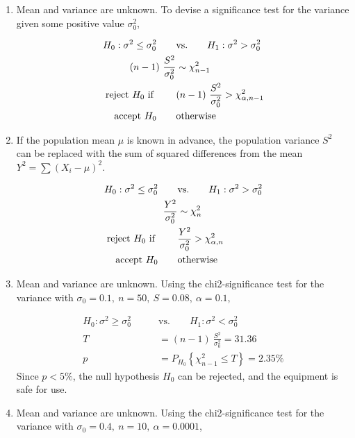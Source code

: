 \begin{enumerate}
	\item Mean and variance are unknown. To devise a significance test for the variance given some positive value $ \sigma^2_0 $,
	
	\begin{align}
		H_0 : \sigma^2 \leq \sigma_0^2 \qquad &\text{vs.} \qquad H_1 : \sigma^2 > \sigma_0^2 \nonumber \\
		(n-1)\ \frac{S^2}{\sigma_0^2} &\sim \chi^2_{n-1} \nonumber \\
		\text{reject $ H_0 $ if } \qquad & (n-1)\ \frac{S^2}{\sigma_0^2} > \chi^2_{\alpha, n-1} \\
		\text{accept $ H_0 $} \qquad & \text{otherwise}
	\end{align}

	\item If the population mean $ \mu $ is known in advance, the population variance $ S^2 $ can be replaced with the sum of squared differences from the mean $ Y^2 = \sum (X_i - \mu)^2 $.
	 
	\begin{align}
		H_0 : \sigma^2 \leq \sigma_0^2 \qquad &\text{vs.} \qquad H_1 : \sigma^2 > \sigma_0^2 \nonumber \\
		\frac{Y^2}{\sigma_0^2} &\sim \chi^2_{n} \nonumber \\
		\text{reject $ H_0 $ if } \qquad & \frac{Y^2}{\sigma_0^2} > \chi^2_{\alpha, n} \\
		\text{accept $ H_0 $} \qquad & \text{otherwise}
	\end{align}

	\item Mean and variance are unknown. Using the chi2-significance test for the variance with $ \sigma_0 = 0.1,\ n = 50,\ S = 0.08,\ \alpha = 0.1 $,
	
	\begin{align}
		H_0 : \sigma^2 \geq \sigma_0^2 \qquad &\text{vs.} \qquad H_1 : \sigma^2 < \sigma_0^2 \nonumber \\
		T &= (n-1)\ \frac{S^2}{\sigma_0^2} = 31.36 \nonumber \\
		p &= P_{H_0}\left\{\chi^2_{n-1} \leq T\right\} = 2.35\% 
	\end{align}
	Since $ p < 5\% $, the null hypothesis $ H_0 $ can be rejected, and the equipment is safe for use.
	
	\item Mean and variance are unknown. Using the chi2-significance test for the variance with $ \sigma_0 = 0.4,\ n = 10,\ \alpha = 0.0001 $,
	

\end{enumerate}

